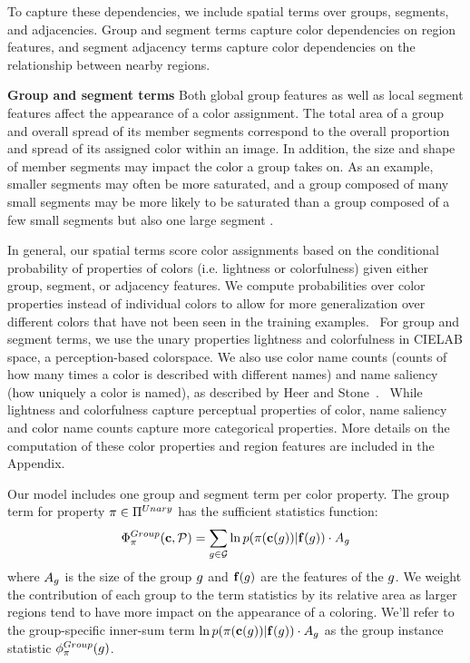 To capture these dependencies, we include spatial terms over groups, segments, and adjacencies. Group and segment terms capture color dependencies on region features, and segment adjacency terms capture color dependencies on the relationship between nearby regions.

\textbf{Group and segment terms}
Both global group features as well as local segment features affect the appearance of a color assignment. The total area of a group and overall spread of its member segments correspond to the overall proportion and spread of its assigned color within an image. In addition, the size and shape of member segments may impact the color a group takes on. As an example, smaller segments may often be more saturated, and a group composed of many small segments may be more likely to be saturated than a group composed of a few small segments but also one large segment .   

In general, our spatial terms score color assignments based on the conditional probability of properties of colors (i.e. lightness or colorfulness) given either group, segment, or adjacency features. We compute probabilities over color properties instead of individual colors to allow for more generalization over different colors that have not been seen in the training examples.~ For group and segment terms, we use the unary properties lightness and colorfulness in CIELAB space, a perception-based colorspace. We also use color name counts (counts of how many times a color is described with different names) and name saliency (how uniquely a color is named), as described by Heer and Stone~.~ While lightness and colorfulness capture perceptual properties of color, name saliency and color name counts capture more categorical properties. More details on the computation of these color properties and region features are included in the Appendix.~

Our model includes one group and segment term per color property. The group term for property $\pi \in \Pi^{Unary}$ has the sufficient statistics function:
\begin{equation*}
 \Phi^{Group}_\pi(\mathbf{c}, \mathcal{P}) = \sum_{g \in \mathcal{G}} \ln p( \pi( \mathbf{c}(g) ) | \mathbf{f}(g)) \cdot A_g
\end{equation*}
where $A_g$ is the size of the group $g$ and $\mathbf{f}(g)$ are the features of the $g$. We weight the contribution of each group to the term statistics by its relative area as larger regions tend to have more impact on the appearance of a coloring. We'll refer to the group-specific inner-sum term $\ln p( \pi( \mathbf{c}(g) ) | \mathbf{f}(g)) \cdot A_g$ as the group instance statistic $\phi^{Group}_\pi(g)$. 

